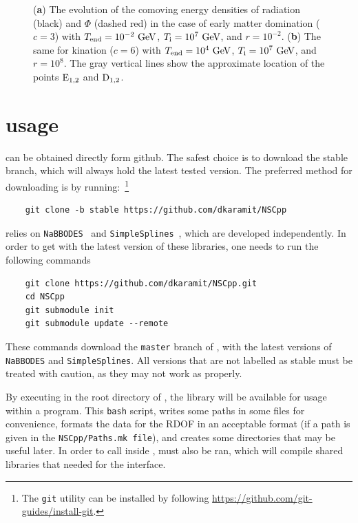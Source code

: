 \documentclass[11pt,a4paper]{article}
\begin{document}
\begin{center}
\begin{figure}[t!]
\begin{subfigure}{0.5\textwidth}
			\caption{}
			\label{fig:EKD}
		\end{subfigure}
		\caption{
			({\bfseries a}) The evolution of the comoving energy densities of radiation (black) and $\Phi$ (dashed red) in the case of early matter domination ($c=3$) with $T_{\rm end}{}=10^{-2}~{\rm GeV}$, $T_{\rm i}{}=10^7~{\rm GeV}$, and $r=10^{-2}$. 
			({\bfseries b}) The same for kination ($c=6$) with $T_{\rm end}{}=10^{4}~{\rm GeV}$, $T_{\rm i}{}=10^7~{\rm GeV}$, and $r=10^{8}$.
			The gray vertical lines show the approximate location of the points ${\rm E_{1,2}}$ and ${\rm D_{1,2}}$.
		} 
		\label{fig:evolution_examples}
	\end{figure}
\end{center}




\section{\nsc usage}\label{sec:first_steps}
\setcounter{equation}{0}
%
\nsc can be obtained directly form github. The safest choice is to download the stable branch, which will always hold the latest tested version. The preferred method for downloading \nsc is by running:~\footnote{The {\tt git} utility can be installed by following \href{https://github.com/git-guides/install-git}{https://github.com/git-guides/install-git}.}
%
\begin{lstlisting}
	git clone -b stable https://github.com/dkaramit/NSCpp
\end{lstlisting}

\nsc relies on {\tt NaBBODES}~\cite{NaBBODES} and {\tt SimpleSplines}~\cite{SimpleSplines}, which are developed independently. In order to get \nsc with the latest version of these libraries, one needs to run the following commands
%
\begin{lstlisting}
	git clone https://github.com/dkaramit/NSCpp.git
	cd NSCpp
	git submodule init
	git submodule update --remote
\end{lstlisting}
%
These commands download the {\tt master} branch of \nsc, with the latest versions of {\tt NaBBODES} and {\tt SimpleSplines}. All versions that are not labelled as stable must be treated with caution, as they may not work as properly. 

By executing  in the root directory of \nsc, the library will be available for usage within a \CPP program. This {\tt bash} script, writes some paths in some files for convenience, formats the data for the RDOF in an acceptable format (if a path is given in the {\tt NSCpp/Paths.mk file}), and creates some directories that may be useful later. In order to call \nsc inside \PY,  must also be ran,  which will compile shared libraries that needed for the \PY interface.
\end{document}
